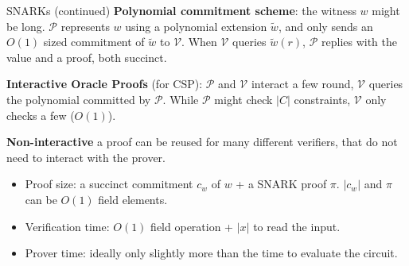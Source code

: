     \begin{frame}{SNARKs (continued)}
        \textbf{Polynomial commitment scheme}: the witness $w$ might be long. $\mathcal{P}$ represents $w$ using a polynomial extension $\tilde{w}$, and only sends an $O(1)$ sized commitment of $\tilde{w}$ to $\mathcal{V}$. When $\mathcal{V}$ queries $\tilde{w}(r)$, $\mathcal{P}$ replies with the value and a proof, both succinct. 
        
        \textbf{Interactive Oracle Proofs} (for CSP): $\mathcal{P}$ and $\mathcal{V}$ interact a few round, $\mathcal{V}$ queries the polynomial committed by $\mathcal{P}$. While $\mathcal{P}$ might check $|C|$ constraints, $\mathcal{V}$ only checks a few ($O(1)$). 
        
        \textbf{Non-interactive} a proof can be reused for many different verifiers, that do not need to interact with the prover. 
        
        \begin{itemize}
            \item Proof size: a succinct commitment $c_w$ of $w$ + a SNARK proof $\pi$. $|c_w|$ and $\pi$ can be $O(1)$ field elements. 
            \item Verification time: $O(1)$ field operation + $|x|$ to read the input.
            \item Prover time: ideally only slightly more than the time to evaluate the circuit.  
        \end{itemize}
        \end{frame}


    

